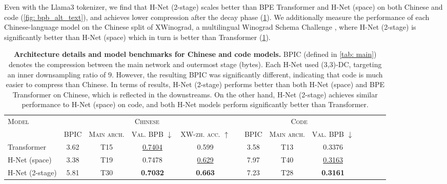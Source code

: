 \documentclass{article}
\newcommand{\citep}{\parencite}
\newcommand{\model}{H-Net}
\newcommand{\main}{main network}
\theoremstyle{plain}
\theoremstyle{remark}
\begin{document}
Even with the Llama3 tokenizer, we find that \model{} (2-stage) scales better than BPE Transformer and \model{} (space) on both Chinese and code (\cref{fig: bpb_alt_text}), and achieves lower compression after the decay phase (\cref{tab: cd-supp}). We additionally measure the performance of each Chinese-language model on the Chinese split of XWinograd, a multilingual Winograd Schema Challenge \citep{xwinograd}, where \model{} (2-stage) is significantly better than \model{} (space) which in turn is better than Transformer (\cref{tab: cd-supp}).

\begin{table}[t!]
\caption{
\textbf{Architecture details and model benchmarks for Chinese and code models.}
BPIC (defined in \cref{tab: main}) denotes the compression between the \main{} and outermost stage (bytes).
Each \model{} used (3,3)-DC, targeting an inner downsampling ratio of $9$.
However, the resulting BPIC was significantly different, indicating that code is much easier to compress than Chinese.
In terms of results, \model{} (2-stage) performs better than both \model{} (space) and BPE Transformer on Chinese, which is reflected in the downstreams.
On the other hand, \model{} (2-stage) achieves similar performance to \model{} (space) on code, and both \model{} models perform significantly better than Transformer.
}

\centering
\small

\begin{tabular}{lcccccccccccc}
\toprule
\multirow{2}{*}{\textsc{Model}}  & \multicolumn{4}{c}{\textsc{Chinese}}                                                  & & \multicolumn{3}{c}{\textsc{Code}} \\
\cmidrule{2-5}
\cmidrule{7-9}
                        & \textsc{BPIC}  & \textsc{Main arch.}            & \textsc{Val. BPB} $\downarrow$ & \textsc{XW-zh. acc.} $\uparrow$      &  & \textsc{BPIC} & \textsc{Main arch.}             & \textsc{Val. BPB} $\downarrow$ \\
\midrule
Transformer             & 3.62  & \colorbox{Main}{T15}  & \underline{0.7404}                & 0.599                       &  & 3.58 & \colorbox{Main}{T13}   & 0.3376                \\
\model{} (space)        & 3.38  & \colorbox{Main}{T19}  & 0.7478                & \underline{0.629}                       &  & 7.97 & \colorbox{Main}{T40}   & \underline{0.3163}                \\
\model{} (2-stage)      & 5.81  & \colorbox{Main}{T30}  & \textbf{0.7032}                & \textbf{0.663}                       &  & 7.23 & \colorbox{Main}{T28}   & \textbf{0.3161}                \\
\bottomrule
\end{tabular}
\label{tab: cd-supp}
\end{table}
\end{document}
